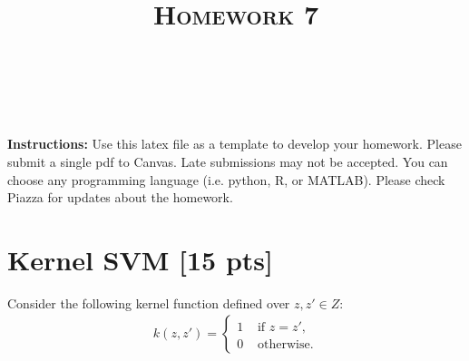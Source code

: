 \documentclass[a4paper]{article}
\title{\textsc{Homework 7}} %
\author{
\red{APOORVA KUMAR} \\
\red{908 461 5997}\\
}
\date{}
\theoremstyle{definition}
\begin{document}
\maketitle 

\textbf{Instructions:}
Use this latex file as a template to develop your homework. Please submit a single pdf to Canvas. Late submissions may not be accepted. You can choose any programming language (i.e. python, R, or MATLAB). Please check Piazza for updates about the homework.
\vspace{0.1in}

\section{Kernel SVM [15 pts]}
Consider the following kernel function defined over $z,z'\in Z$:
\begin{align*}
k(z,z') =
\begin{cases}
1 & \text{~if~} z=z', \\
0 & \text{~otherwise.}
\end{cases}
\end{align*}
\end{document}
